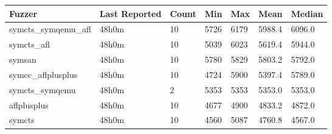 
\begin{table*}[h]
\centering
\begin{tabular}{|l|l|l|l|l|l|l|}
\hline
\textbf{Fuzzer} & \textbf{Last Reported} & \textbf{Count} & \textbf{Min} & \textbf{Max} & \textbf{Mean} & \textbf{Median} \\
\hline
symcts\_symqemu\_afl & 48h0m              & 10     & 5726  & 6179  & 5988.4        & 6096.0     \\
symcts\_afl        & 48h0m              & 10     & 5039  & 6023  & 5619.4        & 5944.0     \\
symsan             & 48h0m              & 10     & 5780  & 5829  & 5803.2        & 5792.0     \\
symcc\_aflplusplus & 48h0m              & 10     & 4724  & 5900  & 5397.4        & 5789.0     \\
symcts\_symqemu    & 48h0m              & 2      & 5353  & 5353  & 5353.0        & 5353.0     \\
aflplusplus        & 48h0m              & 10     & 4677  & 4900  & 4833.2        & 4872.0     \\
symcts             & 48h0m              & 10     & 4560  & 5087  & 4760.8        & 4567.0     \\
\hline
\end{tabular}
\end{table*}